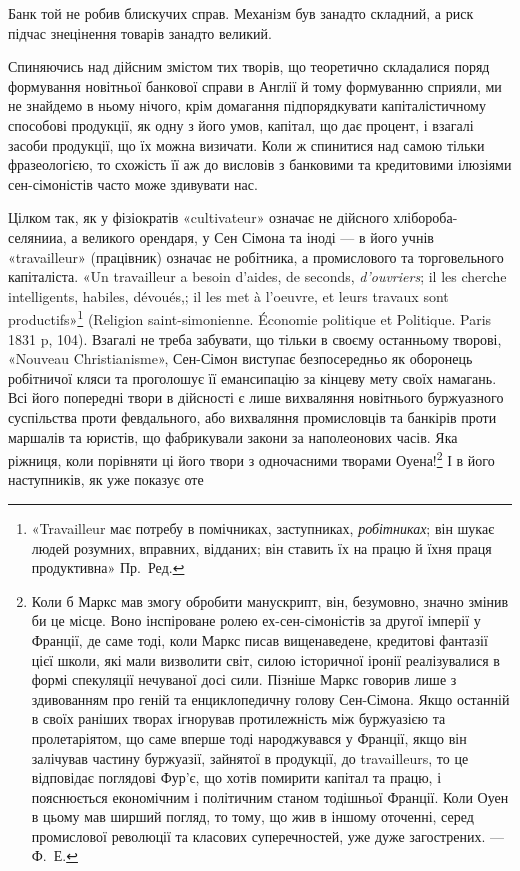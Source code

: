 \parcont{}  %
Банк той не робив блискучих справ. Механізм був занадто складний, а риск
підчас знецінення товарів занадто великий.

Спиняючись над дійсним змістом тих творів, що теоретично складалися
поряд формування новітньої банкової справи в Англії й тому формуванню
сприяли, ми не знайдемо в ньому нічого, крім домагання підпорядкувати
капіталістичному способові продукції, як одну з його умов, капітал, що дає процент,
і взагалі засоби продукції, що їх можна визичати. Коли ж спинитися над
самою тільки фразеологією, то схожість її аж до висловів з банковими та кредитовими
ілюзіями сен-сімоністів часто може здивувати нас.

Цілком так, як у фізіократів «cultivateur» означає не дійсного хлібороба-селянииа,
а великого орендаря, у Сен Сімона та іноді — в його учнів «travailleur»
(працівник) означає не робітника, а промислового та торговельного капіталіста.
«Un travailleur a besoin d’aides, de seconds, \emph{d'ouvriers}; il les cherche
intelligents, habiles, dévoués,; il les met à l’oeuvre, et leurs travaux sont productifs»\footnote*{
«Travailleur має потребу в помічниках, заступниках, \emph{робітниках}; він шукає людей розумних,
вправних, відданих; він ставить їх на працю й їхня праця продуктивна» Пр.~Ред.
}
(Religion saint-simonienne. Économie politique et Politique. Paris 1831 p, 104). Взагалі
не треба забувати, що тільки в своєму останньому творові, «Nouveau Christianisme»,
Сен-Сімон виступає безпосередньо як оборонець робітничої кляси та
проголошує її емансипацію за кінцеву мету своїх намагань. Всі його попередні
твори в дійсності є лише вихваляння новітнього буржуазного суспільства проти
февдального, або вихваляння промисловців та банкірів проти маршалів та юристів,
що фабрикували закони за наполеонових часів. Яка ріжниця, коли порівняти ці його
твори з одночасними творами Оуена!\footnote{
Коли б Маркс мав змогу обробити манускрипт, він, безумовно, значно змінив би це місце.
Воно інспіроване ролею ех-сен-сімоністів за другої імперії у Франції, де саме тоді, коли Маркс
писав вищенаведене, кредитові фантазії цієї школи, які мали визволити світ, силою історичної
іронії реалізувалися в формі спекуляції нечуваної досі сили. Пізніше Маркс говорив лише з
здивованням
про геній та енциклопедичну голову Сен-Сімона. Якщо останній в своїх раніших творах ігнорував
протилежність між буржуазією та пролетаріятом, що саме вперше тоді народжувався у Франції,
якщо він залічував частину буржуазії, зайнятої в продукції, до travailleurs, то це відповідає
поглядові
Фур’є, що хотів помирити капітал та працю, і пояснюється економічним і політичним станом тодішньої
Франції. Коли Оуен в цьому мав ширший погляд, то тому, що жив в іншому оточенні, серед промислової
революції та класових суперечностей, уже дуже загострених. — Ф.~Е.
} І в його наступників, як уже показує оте

